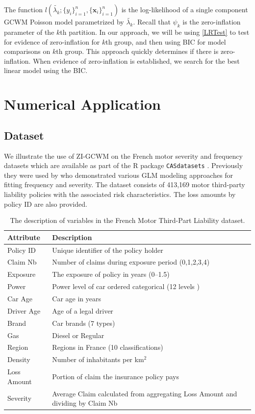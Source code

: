 \documentclass[12pt,letterpaper]{article}
\numberwithin{equation}{section}
\numberwithin{equation}{section}
\numberwithin{equation}{section}
\begin{document}
The function 
$l(\tilde{\lambda_k}; \{y_i\}_{i=1}^n,\{\bm{x}_i\}_{i=1}^n)$ is the log-likelihood of a single component GCWM Poisson model parametrized by $\tilde{\lambda_k}$. Recall that $\psi_k$ is the zero-inflation parameter of the $k$th partition.  In our approach, we will be using \eqref{LRTest} to test for evidence of zero-inflation for $k$th group, and then using BIC for model comparisons on $k$th group. This approach quickly determines if there is zero-inflation.  When evidence of zero-inflation is established, we search for the best linear model using the BIC. 

\section{Numerical Application}\label{sec:numapp}
\subsection{Dataset}
We illustrate the use of ZI-GCWM on the French motor severity and frequency datasets which are available as part of the {\sf R} package {\tt CASdatasets} \citep{Dutang+Charpentier:2016}. Previously they were used by \cite{Charpentier:2014} who demonstrated various GLM modeling approaches for fitting frequency and severity. 
The dataset consists of 413,169 motor third-party liability policies with the associated risk characteristics. The loss amounts by policy ID are also provided. 
\begin{table}[!htb]
\begin{center}
    \caption{The description of variables in the French Motor Third-Part Liability dataset.}
      \centering
       {\small \begin{tabular}{ll}
\hline
Attribute & Description \\
\hline
Policy ID & Unique identifier of the policy holder\\
Claim Nb & Number of claims during exposure period  (0,1,2,3,4)\\
Exposure & The exposure of policy in years (0--1.5) \\
Power & Power level of car ordered categorical (12 levels )\\
Car Age & Car age in years \\
Driver Age & Age of a legal driver \\
Brand & Car brands (7 types) \\
Gas & Diesel or Regular \\
Region & Regions in France (10 classifications)\\
Density & Number of inhabitants per km$^2$ \\
Loss Amount & Portion of claim the insurance policy pays\\
Severity & Average Claim calculated from aggregating Loss Amount and dividing by Claim Nb \\
\hline\end{tabular}}
\end{center}
\end{table}
\end{document}
